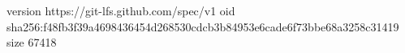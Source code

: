 version https://git-lfs.github.com/spec/v1
oid sha256:f48fb3f39a4698436454d268530cdcb3b84953e6cade6f73bbe68a3258c31419
size 67418
